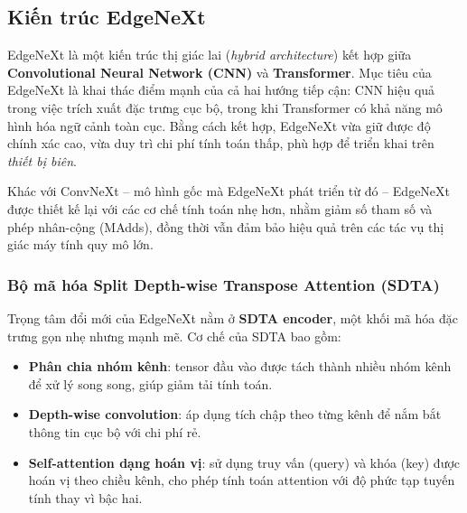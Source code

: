 





\subsection{Kiến trúc EdgeNeXt}

EdgeNeXt là một kiến trúc thị giác lai (\textit{hybrid architecture}) kết hợp giữa \textbf{Convolutional Neural Network (CNN)} và \textbf{Transformer}. Mục tiêu của EdgeNeXt là khai thác điểm mạnh của cả hai hướng tiếp cận: CNN hiệu quả trong việc trích xuất đặc trưng cục bộ, trong khi Transformer có khả năng mô hình hóa ngữ cảnh toàn cục. Bằng cách kết hợp, EdgeNeXt vừa giữ được độ chính xác cao, vừa duy trì chi phí tính toán thấp, phù hợp để triển khai trên \textit{thiết bị biên}. 

Khác với ConvNeXt – mô hình gốc mà EdgeNeXt phát triển từ đó – EdgeNeXt được thiết kế lại với các cơ chế tính toán nhẹ hơn, nhằm giảm số tham số và phép nhân-cộng (MAdds), đồng thời vẫn đảm bảo hiệu quả trên các tác vụ thị giác máy tính quy mô lớn.

\subsubsection{Bộ mã hóa Split Depth-wise Transpose Attention (SDTA)}
Trọng tâm đổi mới của EdgeNeXt nằm ở \textbf{SDTA encoder}, một khối mã hóa đặc trưng gọn nhẹ nhưng mạnh mẽ. Cơ chế của SDTA bao gồm:
\begin{itemize}
    \item \textbf{Phân chia nhóm kênh}: tensor đầu vào được tách thành nhiều nhóm kênh để xử lý song song, giúp giảm tải tính toán.
    \item \textbf{Depth-wise convolution}: áp dụng tích chập theo từng kênh để nắm bắt thông tin cục bộ với chi phí rẻ.
    \item \textbf{Self-attention dạng hoán vị}: sử dụng truy vấn (query) và khóa (key) được hoán vị theo chiều kênh, cho phép tính toán attention với độ phức tạp tuyến tính thay vì bậc hai.
\end{itemize}

